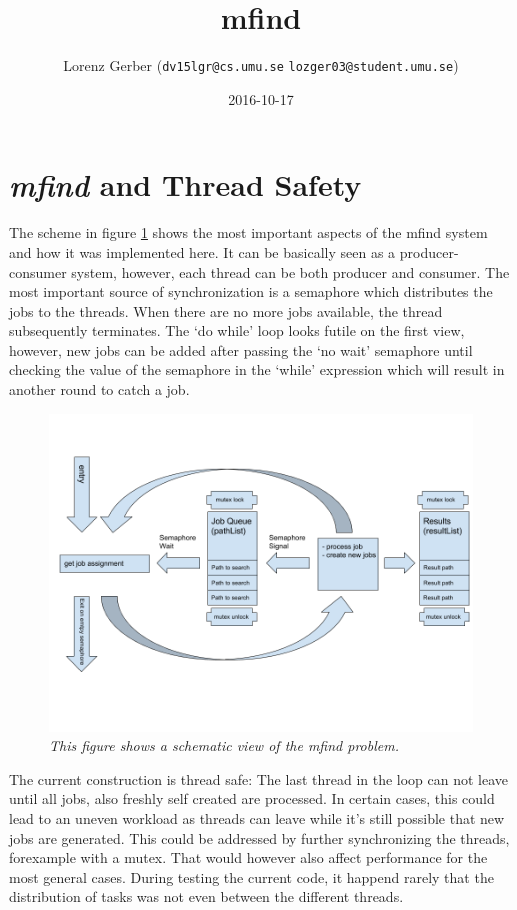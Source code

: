 \documentclass[a4paper,11pt,twoside]{article}
\title{mfind}
\author{Lorenz Gerber ({\tt{dv15lgr@cs.umu.se}} {\tt{lozger03@student.umu.se}})}
\date{2016-10-17}
\begin{document}
\lstset{language=C}
\maketitle
\thispagestyle{empty}
\newpage
\tableofcontents
\thispagestyle{empty}
\newpage

\clearpage
{}

\section{\textit{mfind} and Thread Safety} 

The scheme in figure \ref{fig:scheme} shows the most important aspects of the mfind
system and how it was implemented here. It can be basically seen as a
producer-consumer system, however, each thread can be both producer
and consumer. The most important source of synchronization is a
semaphore \cite[chapter 15.8] {stevensrago2013} which distributes the jobs to the
threads. When there are no more jobs available, the thread
subsequently terminates. The `do while' loop looks futile on the first
view, however, new jobs can be added after passing the `no wait'
semaphore until checking the value of the semaphore in the `while'
expression which will result in another round to catch a job. 

\begin{figure}
\centering
\includegraphics[width=\textwidth]{schema.png}
\caption{\textit{This figure shows a schematic view of the mfind problem.}}
\label{fig:scheme}
\end{figure}

The current construction is thread safe: The last thread in the loop
can not leave until all jobs, also freshly self created are
processed. In certain cases, this could lead to an uneven
workload as threads can leave while it's still possible that new jobs
are generated. This could be addressed by further synchronizing the
threads, forexample with a mutex. That would however also affect
performance for the most general cases. During testing the current
code, it happend rarely that the distribution of tasks was not even
between the different threads.   
\end{document}
